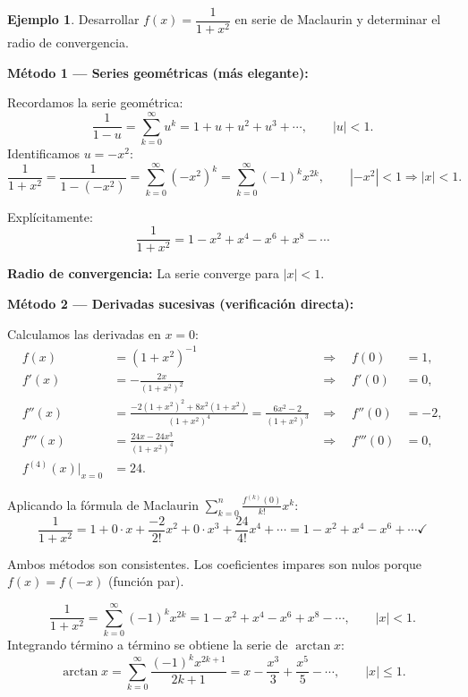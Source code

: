 \documentclass[a4paper,12pt]{article}
\theoremstyle{definition}
\newtheorem{ejemplo}{Ejemplo}[section]
\theoremstyle{plain}
\begin{document}
\begin{ejemplo}
Desarrollar $f(x) = \dfrac{1}{1+x^2}$ en serie de Maclaurin y determinar el
radio de convergencia.

\medskip
\textbf{Método 1 — Series geométricas (más elegante):}

Recordamos la serie geométrica:
\[
    \frac{1}{1-u} = \sum_{k=0}^{\infty} u^k = 1 + u + u^2 + u^3 + \cdots,
    \qquad |u| < 1.
\]
Identificamos $u = -x^2$:
\[
    \frac{1}{1+x^2} = \frac{1}{1-(-x^2)}
    = \sum_{k=0}^{\infty} (-x^2)^k
    = \sum_{k=0}^{\infty} (-1)^k x^{2k},
    \qquad |{-x^2}| < 1 \Rightarrow |x| < 1.
\]

Explícitamente:
\[
    \frac{1}{1+x^2} = 1 - x^2 + x^4 - x^6 + x^8 - \cdots
\]

\medskip
\textbf{Radio de convergencia:} La serie converge para $|x| < 1$.

\medskip
\textbf{Método 2 — Derivadas sucesivas (verificación directa):}

Calculamos las derivadas en $x = 0$:
\begin{align*}
f(x) &= (1+x^2)^{-1}
        &\Rightarrow\quad f(0) &= 1, \\
f'(x) &= -\frac{2x}{(1+x^2)^2}
         &\Rightarrow\quad f'(0) &= 0, \\
f''(x) &= \frac{-2(1+x^2)^2 + 8x^2(1+x^2)}{(1+x^2)^4}
          = \frac{6x^2 - 2}{(1+x^2)^3}
          &\Rightarrow\quad f''(0) &= -2, \\
f'''(x) &= \frac{24x - 24x^3}{(1+x^2)^4}
           &\Rightarrow\quad f'''(0) &= 0, \\
f^{(4)}(x)\big|_{x=0} &= 24.
\end{align*}

Aplicando la fórmula de Maclaurin $\sum_{k=0}^{n}
\frac{f^{(k)}(0)}{k!}x^k$:
\[
    \frac{1}{1+x^2} = 1 + 0 \cdot x + \frac{-2}{2!}x^2
                    + 0 \cdot x^3 + \frac{24}{4!}x^4 + \cdots
    = 1 - x^2 + x^4 - x^6 + \cdots \checkmark
\]

Ambos métodos son consistentes. Los coeficientes impares son nulos porque
$f(x) = f(-x)$ (función par).

\begin{cajaresultado}
\[
    \frac{1}{1+x^2} = \sum_{k=0}^{\infty} (-1)^k x^{2k}
    = 1 - x^2 + x^4 - x^6 + x^8 - \cdots,
    \qquad |x| < 1.
\]
Integrando término a término se obtiene la serie de $\arctan x$:
\[
    \arctan x = \sum_{k=0}^{\infty} \frac{(-1)^k x^{2k+1}}{2k+1}
    = x - \frac{x^3}{3} + \frac{x^5}{5} - \cdots,
    \qquad |x| \leq 1.
\]
\end{cajaresultado}
\end{ejemplo}
\end{document}
